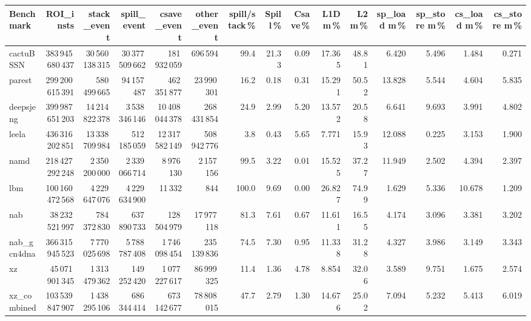 \documentclass[9pt,landscape,a4paper]{article}
\begin{document}
\vspace{2mm}
\centering
\begin{adjustbox}{max width=\textwidth, max totalheight=0.50\textheight}%
\begin{tabular}{lrrrrrrrrrrrrrr}
\toprule
Benchmark & ROI\_insts & stack\_event & \textbf{spill\_event} & csave\_event & other\_event & spill/stack\,\% & Spill\,\% & Csave\,\% & L1D m\,\% & L2 m\,\% & sp\_load m\,\% & sp\_store m\,\% & cs\_load m\,\% & cs\_store m\,\% \\
\midrule
cactuBSSN & 383\,945\,680\,437 & 30\,560\,138\,315 & 30\,377\,509\,662 & 181\,932\,059 & 696\,594 & 99.4 & 21.33 & 0.09 & 17.365 & 48.81 & 6.420 & 5.496 & 1.484 & 0.271 \\
parest & 299\,200\,615\,391 & 580\,499\,665 & 94\,157\,487 & 462\,351\,877 & 23\,990\,301 & 16.2 & 0.18 & 0.31 & 15.291 & 50.52 & 13.828 & 5.544 & 4.604 & 5.835 \\
deepsjeng & 399\,987\,651\,203 & 14\,214\,822\,378 & 3\,538\,346\,146 & 10\,408\,044\,378 & 268\,431\,854 & 24.9 & 2.99 & 5.20 & 13.572 & 20.58 & 6.641 & 9.693 & 3.991 & 4.802 \\
leela & 436\,316\,202\,851 & 13\,338\,709\,984 & 512\,185\,059 & 12\,317\,582\,149 & 508\,942\,776 & 3.8 & 0.43 & 5.65 & 7.771 & 15.93 & 12.088 & 0.225 & 3.153 & 1.900 \\
namd & 218\,427\,292\,248 & 2\,350\,200\,000 & 2\,339\,066\,714 & 8\,976\,130 & 2\,157\,156 & 99.5 & 3.22 & 0.01 & 15.525 & 37.27 & 11.949 & 2.502 & 4.394 & 2.397 \\
lbm & 100\,160\,472\,568 & 4\,229\,647\,076 & 4\,229\,634\,900 & 11\,332 & 844 & 100.0 & 9.69 & 0.00 & 26.827 & 74.99 & 1.629 & 5.336 & 10.678 & 1.209 \\
nab & 38\,232\,521\,997 & 784\,372\,830 & 637\,890\,733 & 128\,504\,979 & 17\,977\,118 & 81.3 & 7.61 & 0.67 & 11.611 & 16.55 & 4.174 & 3.096 & 3.381 & 3.202 \\
nab\_gcn4dna & 366\,315\,945\,523 & 7\,770\,025\,698 & 5\,788\,787\,408 & 1\,746\,098\,454 & 235\,139\,836 & 74.5 & 7.30 & 0.95 & 11.338 & 31.28 & 4.327 & 3.986 & 3.149 & 3.343 \\
xz & 45\,071\,901\,345 & 1\,313\,479\,362 & 149\,252\,420 & 1\,077\,227\,617 & 86\,999\,325 & 11.4 & 1.36 & 4.78 & 8.854 & 32.06 & 3.589 & 9.751 & 1.675 & 2.574 \\
xz\_combined & 103\,539\,847\,907 & 1\,438\,295\,106 & 686\,344\,414 & 673\,142\,677 & 78\,808\,015 & 47.7 & 2.79 & 1.30 & 14.676 & 25.02 & 7.094 & 5.232 & 5.413 & 6.019 \\

\end{tabular}
\end{adjustbox}
\end{document}
